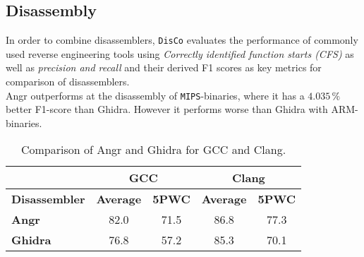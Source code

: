 \documentclass[seminar]{plai}
\begin{document}
\begin{table}[h]
\centering
{}
\caption{Comparison of Angr and Ghidra for Recompile Success Rate and Coverage Equivalence Rate.\cite{decompileBench-comprehensice-benchmark-for-evaluating-decompilers-in-real-world-scenarios}}
\label{sec:decompileBench-comparison}
\end{table}

\subsection{Disassembly}
In order to combine disassemblers, \texttt{DisCo} evaluates the performance of commonly used reverse engineering tools using \textit{Correctly identified function starts (CFS)} as well as \textit{precision and recall} and their derived F1 scores as key metrics for comparison of disassemblers.\\
Angr outperforms at the disassembly of \texttt{MIPS}-binaries, where it has a $4.035\,\%$ better F1-score than Ghidra.
However it performs worse than Ghidra with \texttt{}{ARM}-binaries.
\begin{table}[H]
\centering
\begin{tabular}{|l|c|c||c|c|}
\hline
 & \multicolumn{2}{c||}{\textbf{GCC}} & \multicolumn{2}{c|}{\textbf{Clang}} \\
\hline
\textbf{Disassembler} & \textbf{Average} & \textbf{5PWC} & \textbf{Average} & \textbf{5PWC} \\
\hline
\textbf{Angr}   & 82.0 & 71.5 & 86.8 & 77.3 \\
\hline
\textbf{Ghidra} & 76.8 & 57.2 & 85.3 & 70.1 \\
\hline
\end{tabular}
\caption{Comparison of Angr and Ghidra for GCC and Clang.\cite{DisCo-combining-disassemblers-for-improved-performance}}
\end{table}
\end{document}
